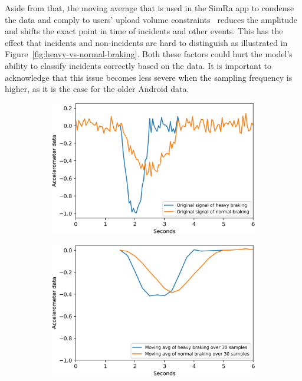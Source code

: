 Aside from that, the moving average that is used in the SimRa app to condense the data and comply to users' upload volume constraints~\cite{karakaya2020simra} reduces the amplitude and shifts the exact point in time of incidents and other events.
This has the effect that incidents and non-incidents are hard to distinguish as illustrated in Figure~\ref{fig:heavy-vs-normal-braking}.
Both these factors could hurt the model's ability to classify incidents correctly based on the data.
It is important to acknowledge that this issue becomes less severe when the sampling frequency is higher, as it is the case for the older Android data.

\begin{figure}[t]
	\centering
	\begin{subfigure}[b]{0.475\textwidth}
		\centering
		\includegraphics[width=\textwidth]{fig/heavy_vs_normal_braking}
	\end{subfigure}
	\hfill
	\begin{subfigure}[b]{0.475\textwidth}
		\centering
		\includegraphics[width=\textwidth]{fig/mvn_avg_heavy_vs_normal_braking.png}

\end{subfigure}
\end{figure}
